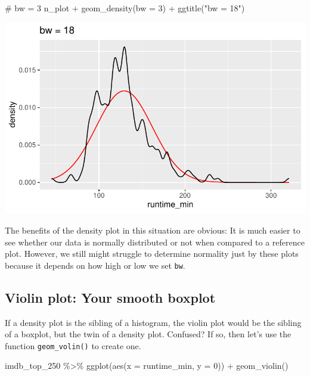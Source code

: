 \documentclass[
  letterpaper,
]{krantz}
\makeatletter
\newenvironment{Shaded}{\begin{snugshade}}{\end{snugshade}}
\newcommand{\AttributeTok}[1]{\textcolor[rgb]{0.40,0.45,0.13}{#1}}
\newcommand{\CommentTok}[1]{\textcolor[rgb]{0.37,0.37,0.37}{#1}}
\newcommand{\DecValTok}[1]{\textcolor[rgb]{0.68,0.00,0.00}{#1}}
\newcommand{\FunctionTok}[1]{\textcolor[rgb]{0.28,0.35,0.67}{#1}}
\newcommand{\NormalTok}[1]{\textcolor[rgb]{0.00,0.23,0.31}{#1}}
\newcommand{\SpecialCharTok}[1]{\textcolor[rgb]{0.37,0.37,0.37}{#1}}
\newcommand{\StringTok}[1]{\textcolor[rgb]{0.13,0.47,0.30}{#1}}
\newenvironment{kframe}{%
\medskip{}
\setlength{\fboxsep}{.8em}
 \def\at@end@of@kframe{}%
 \ifinner\ifhmode%
  \def\at@end@of@kframe{\end{minipage}}%
  \begin{minipage}{\columnwidth}%
 \fi\fi%
 \def\FrameCommand##1{\hskip\@totalleftmargin \hskip-\fboxsep
 \colorbox{shadecolor}{##1}\hskip-\fboxsep
     \hskip-\linewidth \hskip-\@totalleftmargin \hskip\columnwidth}%
 \MakeFramed {\advance\hsize-\width
   \@totalleftmargin\z@ \linewidth\hsize
   \@setminipage}}%
 {\par\unskip\endMakeFramed%
 \at@end@of@kframe}
\renewenvironment{Shaded}{\begin{kframe}}{\end{kframe}}
\makeatother
\begin{document}
\begin{Shaded}
\begin{Highlighting}[]
\CommentTok{\# bw = 3}
\NormalTok{n\_plot }\SpecialCharTok{+}
  \FunctionTok{geom\_density}\NormalTok{(}\AttributeTok{bw =} \DecValTok{3}\NormalTok{) }\SpecialCharTok{+}
  \FunctionTok{ggtitle}\NormalTok{(}\StringTok{"bw = 18"}\NormalTok{)}
\end{Highlighting}
\end{Shaded}

\includegraphics{08_descriptive_statistics_files/figure-pdf/density-vs-normal-bw-settings-three-1.pdf}

The benefits of the density plot in this situation are obvious: It is
much easier to see whether our data is normally distributed or not when
compared to a reference plot. However, we still might struggle to
determine normality just by these plots because it depends on how high
or low we set \texttt{bw}.

\subsection{Violin plot: Your smooth
boxplot}\label{violin-plot-your-smooth-boxplot}

If a density plot is the sibling of a histogram, the violin plot would
be the sibling of a boxplot, but the twin of a density plot. Confused?
If so, then let's use the function \texttt{geom\_volin()} to create one.

\begin{Shaded}
\begin{Highlighting}[]
\NormalTok{imdb\_top\_250 }\SpecialCharTok{\%\textgreater{}\%}
  \FunctionTok{ggplot}\NormalTok{(}\FunctionTok{aes}\NormalTok{(}\AttributeTok{x =}\NormalTok{ runtime\_min, }\AttributeTok{y =} \DecValTok{0}\NormalTok{)) }\SpecialCharTok{+}
  \FunctionTok{geom\_violin}\NormalTok{()}
\end{Highlighting}
\end{Shaded}
\end{document}
